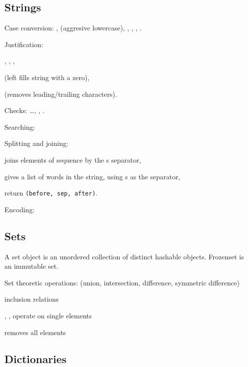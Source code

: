 \subsection{Strings}
\begin{enumx}
\item Case conversion: 
, 
 (aggresive lowercase), 
, 
, 
, 
.

\item Justification: 
\begin{itemx}
	\item {},
		  ,
	      ,

	\item {} 
	(left fills string with a zero),

	\item {} 
	(removes leading/trailing characters).
\end{itemx}

\item Checks:
\ldots,
, 
.

\item Searching:

\item Splitting and joining:
\begin{itemx}
	\item {} joins elements of sequence by the s separator,
	\item {} gives a list of words in the string, using s as the separator,
	\item {} return \texttt{(before, sep, after)}.
\end{itemx}

\item Encoding: 
\end{enumx}

 \subsection{Sets}                                                               
 A set object is an unordered collection of distinct hashable objects.   
 Frozenset is an immutable set.
 \begin{enumx}                                                                   
 \item Set theoretic operations: \python{| \& - \^}                              
   (union, intersection, difference, symmetric difference)                       
 \item \python{< <= > >=} inclusion relations                                    
 \item {}, ,  operate on single elements
 \item {} removes all elements                                       
 \end{enumx}

\subsection{Dictionaries}
